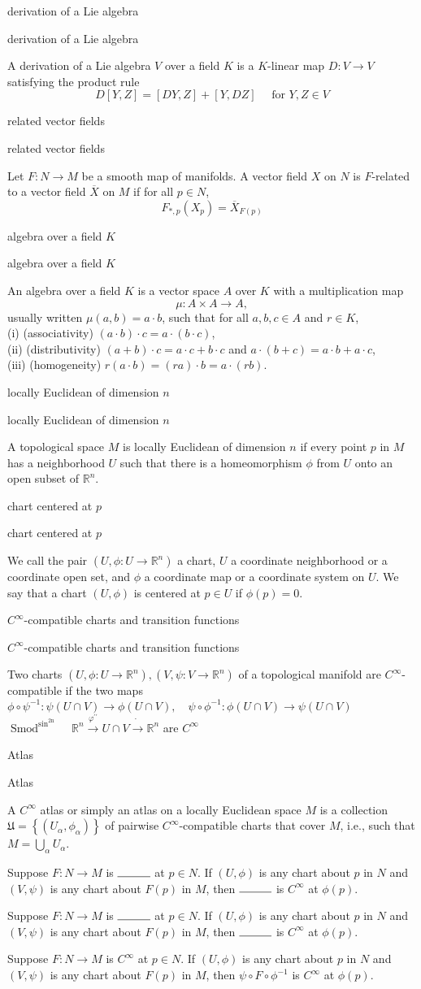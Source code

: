 \documentclass[17pt]{extarticle}
\renewcommand{\bar}[1]{\overline{#1}}
\newcommand{\boxset}[2]{\begin{mdframed}[style=darkQuesion]
#1
\end{mdframed}
\newpage
\begin{mdframed}[style=darkQuesion]
  #1
    \end{mdframed}
\begin{mdframed}[style=darkAnswer]
  #2
    \end{mdframed}
    \newpage
}
\begin{document}
\boxset{derivation of a Lie algebra}
{A derivation of a Lie algebra $V$ over a field $K$ is a $K$-linear map $D: V \rightarrow V$ satisfying the product rule
\[D[Y, Z]=[D Y, Z]+[Y, D Z] \quad \text { for } Y, Z \in V\]}
\boxset{related vector fields}
{Let $F: N \rightarrow M$ be a smooth map of manifolds. A vector field $X$ on $N$ is $F$-related to a vector field $\bar{X}$ on $M$ if for all $p \in N$,\[F_{*, p}\left(X_{p}\right)=\bar{X}_{F(p)}\]}
\boxset{algebra over a field $K$}
{An algebra over a field $K$ is a vector space $A$ over $K$ with a multiplication map
\[\mu: A \times A \rightarrow A,\]
usually written $\mu(a, b)=a \cdot b$, such that for all $a, b, c \in A$ and $r \in K$,\[\ \]
(i) (associativity) $(a \cdot b) \cdot c=a \cdot(b \cdot c)$,\[\ \]
(ii) (distributivity) $(a+b) \cdot c=a \cdot c+b \cdot c$ and $a \cdot(b+c)=a \cdot b+a \cdot c$,\[\ \]
(iii) (homogeneity) $r(a \cdot b)=(r a) \cdot b=a \cdot(r b)$.}
\boxset{locally Euclidean of dimension $n$}
{A topological space $M$ is locally Euclidean of dimension $n$ if every point $p$ in $M$ has a neighborhood $U$ such that there is a homeomorphism $\phi$ from $U$ onto an open subset of $\mathbb{R}^{n}$.}
\boxset{chart centered at $p$}
{We call the pair $\left(U, \phi: U \rightarrow \mathbb{R}^{n}\right)$ a chart, $U$ a coordinate neighborhood or a coordinate open set, and $\phi$ a coordinate map or a coordinate system on $U$. We say that a chart $(U, \phi)$ is centered at $p \in U$ if $\phi(p)=0$.}
\boxset{$C^{\infty}$-compatible charts and transition functions}
{Two charts $\left(U, \phi: U \rightarrow \mathbb{R}^{n}\right),\left(V, \psi: V \rightarrow \mathbb{R}^{n}\right)$ of a topological manifold are $C^{\infty}$-compatible if the two maps
$\phi \circ \psi^{-1}: \psi(U \cap V) \rightarrow \phi(U \cap V), \quad \psi \circ \phi^{-1}: \phi(U \cap V) \rightarrow \psi(U \cap V)$
$\operatorname{Smod}^{\sin ^{\text {2n }}} \quad \mathbb{R}^{n} \stackrel{\varphi^{\prime \prime}}{\rightarrow} U \cap V \dot{\longrightarrow} \mathbb{R}^{n}$
are $C^{\infty}$ }
\boxset{Atlas}
{A $C^{\infty}$ atlas or simply an atlas on a locally Euclidean space $M$ is a collection $\mathfrak{U}=\left\{\left(U_{\alpha}, \phi_{\alpha}\right)\right\}$ of pairwise $C^{\infty}$-compatible charts that cover $M$, i.e., such that $M=\bigcup_{\alpha} U_{\alpha}$.}
\boxset{Suppose $F: N \rightarrow M$ is $\rule{1cm}{0.15mm}$ at $p \in N$. If $(U, \phi)$ is any chart about $p$ in $N$ and $(V, \psi)$ is any chart about $F(p)$ in $M$, then $\rule{1cm}{0.15mm}$ is $C^{\infty}$ at $\phi(p)$.}
{Suppose $F: N \rightarrow M$ is $C^{\infty}$ at $p \in N$. If $(U, \phi)$ is any chart about $p$ in $N$ and $(V, \psi)$ is any chart about $F(p)$ in $M$, then $\psi \circ F \circ \phi^{-1}$ is $C^{\infty}$ at $\phi(p)$.}
\end{document}
